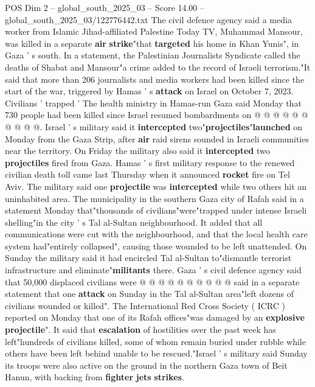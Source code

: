 \begin{textsample}{POS Dim 2 – global\_south\_2025\_03 – Score 14.00 – global\_south\_2025\_03/122776442.txt}
The civil defence agency said a media worker from Islamic Jihad-affiliated Palestine Today TV, Muhammad Mansour, was killed in a separate \textbf{air} \textbf{strike}"that \textbf{targeted} his home in Khan Yunis", in Gaza ' s south.
In a statement, the Palestinian Journalists Syndicate called the deaths of Shabat and Mansour"a crime added to the record of Israeli terrorism."It said that more than 206 journalists and media workers had been killed since the start of the war, triggered by Hamas ' s \textbf{attack} on Israel on October 7, 2023.
Civilians ' trapped ' The health ministry in Hamas-run Gaza said Monday that 730 people had been killed since Israel resumed bombardments on @ @ @ @ @ @ @ @ @ @.
Israel ' s military said it \textbf{intercepted} two"\textbf{projectiles}"\textbf{launched} on Monday from the Gaza Strip, after \textbf{air} raid sirens sounded in Israeli communities near the territory.
On Friday the military also said it \textbf{intercepted} two \textbf{projectiles} fired from Gaza.
Hamas ' s first military response to the renewed civilian death toll came last Thursday when it announced \textbf{rocket} fire on Tel Aviv.
The military said one \textbf{projectile} was \textbf{intercepted} while two others hit an uninhabited area.
The municipality in the southern Gaza city of Rafah said in a statement Monday that"thousands of civilians"were"trapped under intense Israeli shelling"in the city ' s Tal al-Sultan neighbourhood.
It added that all communications were cut with the neighbourhood, and that the local health care system had"entirely collapsed", causing those wounded to be left unattended.
On Sunday the military said it had encircled Tal al-Sultan to"dismantle terrorist infrastructure and eliminate"\textbf{militants} there.
Gaza ' s civil defence agency said that 50,000 displaced civilians were @ @ @ @ @ @ @ @ @ @ said in a separate statement that one \textbf{attack} on Sunday in the Tal al-Sultan area"left dozens of civilians wounded or killed".
The International Red Cross Society ( ICRC ) reported on Monday that one of its Rafah offices"was damaged by an \textbf{explosive} \textbf{projectile}".
It said that \textbf{escalation} of hostilities over the past week has left"hundreds of civilians killed, some of whom remain buried under rubble while others have been left behind unable to be rescued."Israel ' s military said Sunday its troops were also active on the ground in the northern Gaza town of Beit Hanun, with backing from \textbf{fighter} \textbf{jets} \textbf{strikes}.

\end{textsample}
